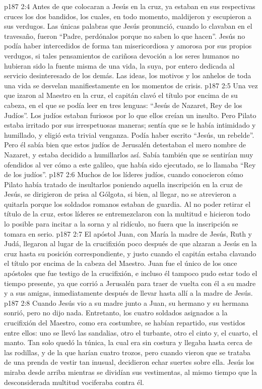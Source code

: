 \vs p187 2:4 Antes de que colocaran a Jesús en la cruz, ya estaban en sus respectivas cruces los dos bandidos, los cuales, en todo momento, maldijeron y escupieron a sus verdugos. Las únicas palabras que Jesús pronunció, cuando lo clavaban en el travesaño, fueron “Padre, perdónalos porque no saben lo que hacen”. Jesús no podía haber intercedidos de forma tan misericordiosa y amorosa por sus propios verdugos, si tales pensamientos de cariñosa devoción a los seres humanos no hubieran sido la fuente misma de una vida, la suya, por entero dedicada al servicio desinteresado de los demás. Las ideas, los motivos y los anhelos de toda una vida se desvelan manifiestamente en los momentos de crisis.
\vs p187 2:5 Una vez que izaron al Maestro en la cruz, el capitán clavó el título por encima de su cabeza, en el que se podía leer en tres lenguas: “Jesús de Nazaret, Rey de los Judíos”. Los judíos estaban furiosos por lo que ellos creían un insulto. Pero Pilato estaba irritado por sus irrespetuosas maneras; sentía que se le había intimidado y humillado, y eligió esta trivial venganza. Podía haber escrito “Jesús, un rebelde”. Pero él sabía bien que estos judíos de Jerusalén detestaban el mero nombre de Nazaret, y estaba decidido a humillarlos así. Sabía también que se sentirían muy ofendidos al ver cómo a este galileo, que había sido ejecutado, se lo llamaba “Rey de los judíos”.
\vs p187 2:6 Muchos de los líderes judíos, cuando conocieron cómo Pilato había tratado de insultarlos poniendo aquella inscripción en la cruz de Jesús, se dirigieron de prisa al Gólgota, si bien, al llegar, no se atrevieron a quitarla porque los soldados romanos estaban de guardia. Al no poder retirar el título de la cruz, estos líderes se entremezclaron con la multitud e hicieron todo lo posible para incitar a la sorna y al ridículo, no fuera que la inscripción se tomara en serio.
\vs p187 2:7 El apóstol Juan, con María la madre de Jesús, Ruth y Judá, llegaron al lugar de la crucifixión poco después de que alzaran a Jesús en la cruz hasta su posición correspondiente, y justo cuando el capitán estaba clavando el título por encima de la cabeza del Maestro. Juan fue el único de los once apóstoles que fue testigo de la crucifixión, e incluso él tampoco pudo estar todo el tiempo presente, ya que corrió a Jerusalén para traer de vuelta con él a su madre y a sus amigas, inmediatamente después de llevar hasta allí a la madre de Jesús.
\vs p187 2:8 Cuando Jesús vio a su madre junto a Juan, su hermano y su hermana sonrió, pero no dijo nada. Entretanto, los cuatro soldados asignados a la crucifixión del Maestro, como era costumbre, se habían repartido, sus vestidos entre ellos: uno se llevó las sandalias, otro el turbante, otro el cinto y, el cuarto, el manto. Tan solo quedó la túnica, la cual era sin costura y llegaba hasta cerca de las rodillas, y de la que harían cuatro trozos, pero cuando vieron que se trataba de una prenda de vestir tan inusual, decidieron echar suertes sobre ella. Jesús los miraba desde arriba mientras se dividían sus vestimentas, al mismo tiempo que la desconsiderada multitud vociferaba contra él.
